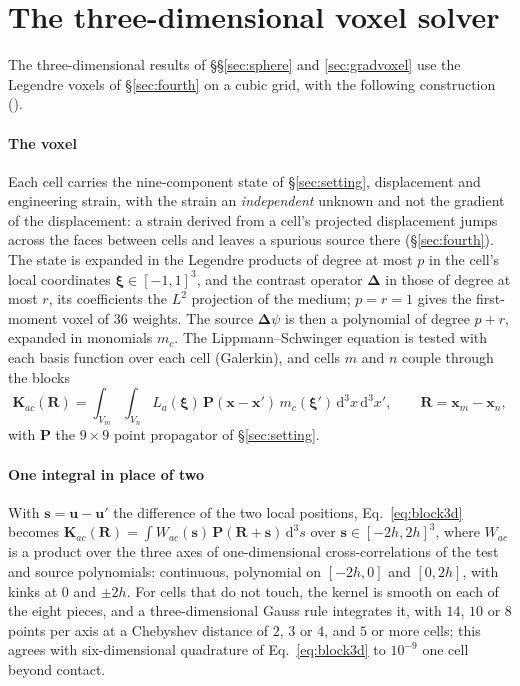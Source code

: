 \documentclass[preprint,review,12pt]{elsarticle}
\newcommand{\bK}{\mathbf{K}}
\newcommand{\bP}{\mathbf{P}}
\newcommand{\bD}{\boldsymbol{\Delta}}
\newcommand{\dd}{\mathrm{d}}
\begin{document}
\FloatBarrier

\section{The three-dimensional voxel solver}\label{app:solver}

The three-dimensional results of \S\S\ref{sec:sphere} and \ref{sec:gradvoxel} use the Legendre voxels
of \S\ref{sec:fourth} on a cubic grid, with the following construction
().

\paragraph{The voxel} Each cell carries the nine-component state of \S\ref{sec:setting}, displacement
and engineering strain, with the strain an \emph{independent} unknown and not the gradient of the
displacement: a strain derived from a cell's projected displacement jumps across the faces between
cells and leaves a spurious source there (\S\ref{sec:fourth}). The state is expanded in the Legendre
products of degree at most $p$ in the cell's local coordinates $\boldsymbol\xi\in[-1,1]^3$, and the
contrast operator $\bD$ in those of degree at most $r$, its coefficients the $L^2$ projection of the
medium; $p=r=1$ gives the first-moment voxel of $36$ weights. The source $\bD\psi$ is then a polynomial
of degree $p+r$, expanded in monomials $m_c$. The Lippmann--Schwinger equation is tested with each basis
function over each cell (Galerkin), and cells $m$ and $n$ couple through the blocks
\begin{equation}\label{eq:block3d}
  \bK_{ac}(\mathbf{R})=\int_{V_m}\!\int_{V_n}L_a(\boldsymbol\xi)\,\bP(\mathbf{x}-\mathbf{x}')\,
  m_c(\boldsymbol\xi')\,\dd^3x\,\dd^3x',\qquad \mathbf{R}=\mathbf{x}_m-\mathbf{x}_n,
\end{equation}
with $\bP$ the $9\times9$ point propagator of \S\ref{sec:setting}.

\paragraph{One integral in place of two} With $\mathbf{s}=\mathbf{u}-\mathbf{u}'$ the difference of the
two local positions, Eq.~\eqref{eq:block3d} becomes
$\bK_{ac}(\mathbf{R})=\int W_{ac}(\mathbf{s})\,\bP(\mathbf{R}+\mathbf{s})\,\dd^3s$ over
$\mathbf{s}\in[-2h,2h]^3$, where $W_{ac}$ is a product over the three axes of one-dimensional
cross-correlations of the test and source polynomials: continuous, polynomial on $[-2h,0]$ and $[0,2h]$,
with kinks at $0$ and $\pm2h$. For cells that do not touch, the kernel is smooth on each of the eight
pieces, and a three-dimensional Gauss rule integrates it, with $14$, $10$ or $8$ points per axis at a
Chebyshev distance of $2$, $3$ or $4$, and $5$ or more cells; this agrees with six-dimensional quadrature
of Eq.~\eqref{eq:block3d} to $10^{-9}$ one cell beyond contact.
\end{document}
